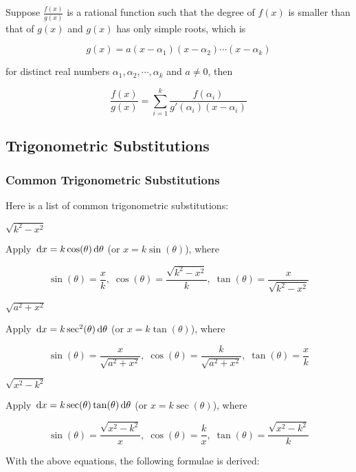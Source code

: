 \documentclass[a4paper,12pt]{article}
\begin{document}
\begin{thm}
  Suppose $\frac{f(x)}{g(x)}$ is a rational function such that the degree of $f(x)$ is smaller than that of $g(x)$ and $g(x)$ has only simple roots, which is

  $$g(x)=a(x-\alpha_{1})(x-\alpha_{2})\cdots(x-\alpha_{k})$$\s

  for distinct real numbers $\alpha_{1},\alpha_{2},\cdots,\alpha_{k}$ and $a\neq 0$, then

  $$\frac{f(x)}{g(x)}=\sum_{i=1}^{k}\frac{f(\alpha_{i})}{g'(\alpha_{i})(x-\alpha_{i})}$$
\end{thm}

\subsection{Trigonometric Substitutions}
\subsubsection{Common Trigonometric Substitutions}
Here is a list of common trigonometric substitutions:

\begin{alist}
  \item $\sqrt{k^{2}-x^{2}}$\s

  Apply $\,\mathrm{d} x=k\cos(\theta)\,\mathrm{d}\theta$ (or $x=k\sin(\theta)$), where

  $$\sin(\theta)=\frac{x}{k},\;\cos(\theta)=\frac{\sqrt{k^{2}-x^{2}}}{k},\;\tan(\theta)=\frac{x}{\sqrt{k^{2}-x^{2}}}$$

  \item $\sqrt{a^{2}+x^{2}}$\s

  Apply $\,\mathrm{d} x=k\sec^{2}(\theta)\,\mathrm{d}\theta$ (or $x=k\tan(\theta)$), where

  $$\sin(\theta)=\frac{x}{\sqrt{a^{2}+x^{2}}},\;\cos(\theta)=\frac{k}{\sqrt{a^{2}+x^{2}}},\;\tan(\theta)=\frac{x}{k}$$

  \item $\sqrt{x^{2}-k^{2}}$\s

  Apply $\,\mathrm{d} x=k\sec(\theta)\tan(\theta)\,\mathrm{d}\theta$ (or $x=k\sec(\theta)$), where

  $$\sin(\theta)=\frac{\sqrt{x^{2}-k^{2}}}{x},\;\cos(\theta)=\frac{k}{x},\;\tan(\theta)=\frac{\sqrt{x^{2}-k^{2}}}{k}$$
\end{alist}

With the above equations, the following formulae is derived:
\end{document}
